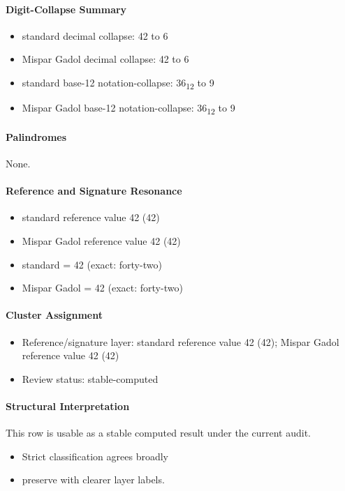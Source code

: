 \paragraph{Digit-Collapse Summary}
\begin{itemize}
\item standard decimal collapse: 42 to 6
\item Mispar Gadol decimal collapse: 42 to 6
\item standard base-12 notation-collapse: 36\textsubscript{12} to 9
\item Mispar Gadol base-12 notation-collapse: 36\textsubscript{12} to 9
\end{itemize}
\paragraph{Palindromes}
None.
\paragraph{Reference and Signature Resonance}
\begin{itemize}
\item standard reference value 42 (42)
\item Mispar Gadol reference value 42 (42)
\item standard = 42 (exact: forty-two)
\item Mispar Gadol = 42 (exact: forty-two)
\end{itemize}
\paragraph{Cluster Assignment}
\begin{itemize}
\item Reference/signature layer: standard reference value 42 (42); Mispar Gadol reference value 42 (42)
\item Review status: stable-computed
\end{itemize}
\paragraph{Structural Interpretation}
This row is usable as a stable computed result under the current audit.

\begin{itemize}
\item Strict classification agrees broadly
\item preserve with clearer layer labels.
\end{itemize}

